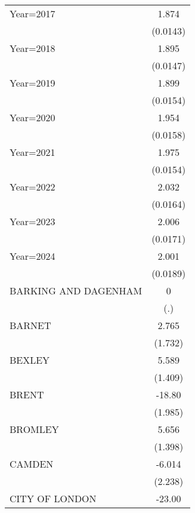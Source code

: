 {\begin{longtable}{l*{1}{c}}
\addlinespace
Year=2017           &       1.874\sym{***}\\
                    &    (0.0143)         \\
\addlinespace
Year=2018           &       1.895\sym{***}\\
                    &    (0.0147)         \\
\addlinespace
Year=2019           &       1.899\sym{***}\\
                    &    (0.0154)         \\
\addlinespace
Year=2020           &       1.954\sym{***}\\
                    &    (0.0158)         \\
\addlinespace
Year=2021           &       1.975\sym{***}\\
                    &    (0.0154)         \\
\addlinespace
Year=2022           &       2.032\sym{***}\\
                    &    (0.0164)         \\
\addlinespace
Year=2023           &       2.006\sym{***}\\
                    &    (0.0171)         \\
\addlinespace
Year=2024           &       2.001\sym{***}\\
                    &    (0.0189)         \\
\addlinespace
BARKING AND DAGENHAM&           0         \\
                    &         (.)         \\
\addlinespace
BARNET              &       2.765         \\
                    &     (1.732)         \\
\addlinespace
BEXLEY              &       5.589\sym{***}\\
                    &     (1.409)         \\
\addlinespace
BRENT               &      -18.80\sym{***}\\
                    &     (1.985)         \\
\addlinespace
BROMLEY             &       5.656\sym{***}\\
                    &     (1.398)         \\
\addlinespace
CAMDEN              &      -6.014\sym{**} \\
                    &     (2.238)         \\
\addlinespace
CITY OF LONDON      &      -23.00         \\

\end{longtable}}
